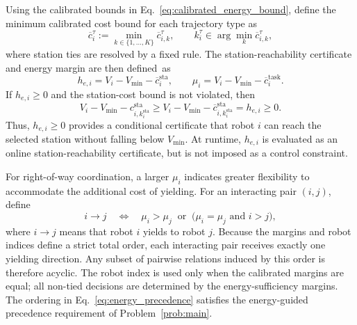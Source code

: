Using the calibrated bounds in Eq.~\eqref{eq:calibrated_energy_bound}, define the minimum calibrated cost bound for each trajectory type as
\begin{equation}
    \overline c_i^\tau:=\min_{k\in\{1,\ldots,K\}}\overline c_{i,k}^\tau,
    \qquad
    k_i^\tau\in\arg\min_k \overline c_{i,k}^\tau,
    \label{eq:minimum_calibrated_cost}
\end{equation}
where station ties are resolved by a fixed rule.
The station-reachability certificate and energy margin are then defined~as
\begin{equation}
    h_{e,i}=V_i-V_{\min}-\overline c_i^{\mathrm{sta}},
    \qquad
    \mu_i=V_i-V_{\min}-\overline c_i^{\mathrm{task}}.
    \label{eq:calibrated_energy_quantities}
\end{equation}
If $h_{e,i}\geq0$ and the station-cost bound is not violated, then
\begin{equation}
    V_i - V_{\min}-c_{i, k_i^\mathrm{sta}}^{\mathrm{sta}}
    \geq V_i - V_{\min} -\overline{c}_{i, k_i^{\mathrm{sta}}}^{\mathrm{sta}} = h_{e, i} \geq 0.
    \label{eq:conditional_station_reachability}
\end{equation}
Thus, $h_{e,i}\geq0$ provides a conditional certificate that robot $i$ can reach the selected station without falling below $V_{\min}$.
At runtime, $h_{e,i}$ is evaluated as an online station-reachability certificate, but is not imposed as a control constraint.

For right-of-way coordination, a larger $\mu_i$ indicates greater flexibility to accommodate the additional cost of yielding.
For an interacting pair $(i,j)$, define
\begin{equation}
    i\rightarrow j
    \quad\Longleftrightarrow\quad
    \mu_i>\mu_j
    \;\;\text{or}\;\;
    \bigl(\mu_i=\mu_j \text{ and } i>j\bigr),
    \label{eq:energy_precedence}
\end{equation}
where $i\rightarrow j$ means that robot $i$ yields to robot $j$.
Because the margins and robot indices define a strict total order, each interacting pair receives exactly one yielding direction.
Any subset of pairwise relations induced by this order is therefore acyclic.
The robot index is used only when the calibrated margins are equal; all non-tied decisions are determined by the energy-sufficiency margins.
The ordering in Eq.~\eqref{eq:energy_precedence} satisfies the energy-guided precedence requirement of Problem~\ref{prob:main}.
